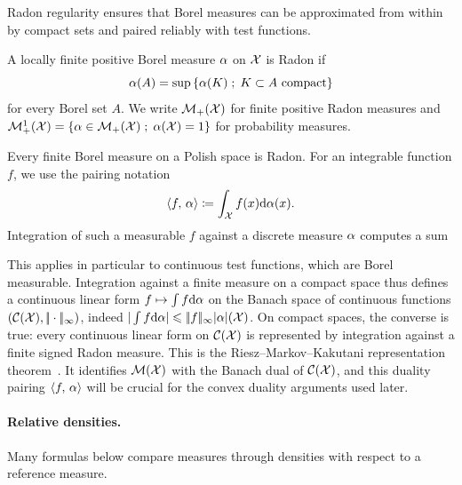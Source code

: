 Radon regularity ensures that Borel measures can be approximated from within by compact sets and paired reliably with test functions.
\begin{defn}\label{def-radon-probability-measures}
	A locally finite positive Borel measure $\alpha$ on $\mathcal{X}$ is Radon if
	\[
		\alpha(A)=\sup\left\{ \alpha(K) \;;\; K\subset A\text{ compact} \right\}
	\]
	for every Borel set $A$. We write $\mathcal{M}_+(\mathcal{X})$ for finite positive Radon measures and
	$\mathcal{M}_+^1(\mathcal{X})=\left\{ \alpha\in\mathcal{M}_+(\mathcal{X}) \;;\; \alpha(\mathcal{X})=1 \right\}$ for probability measures.
\end{defn}
Every finite Borel measure on a Polish space is Radon.
For an integrable function $f$, we use the pairing notation
\[
	\langle f,\,\alpha\rangle\coloneqq\int_{\mathcal{X}} f(x)\mathrm{d}\alpha(x).
\]
Integration of such a measurable $f$ against a discrete measure $\alpha$ computes a sum


This applies in particular to continuous test functions, which are Borel measurable.
%
Integration against a finite measure on a compact space thus defines a continuous linear form $f \mapsto \int f \mathrm{d}\alpha$ on the Banach space of continuous functions $(\mathcal{C}(\mathcal{X}),|\!| \cdot |\!|_\infty)$, indeed $|\int f \mathrm{d}\alpha| \leqslant |\!| f |\!|_\infty |\alpha|(\mathcal{X})$. On compact spaces, the converse is true: every continuous linear form on $\mathcal{C}(\mathcal{X})$ is represented by integration against a finite signed Radon measure. This is the Riesz--Markov--Kakutani representation theorem~\cite{rudin1987realcomplex,bogachev2007measure}. It identifies $\mathcal{M}(\mathcal{X})$ with the Banach dual of $\mathcal{C}(\mathcal{X})$, and this duality pairing $\langle f,\,\alpha\rangle$ will be crucial for the convex duality arguments used later.

\paragraph{Relative densities.}

Many formulas below compare measures through densities with respect to a reference measure.

